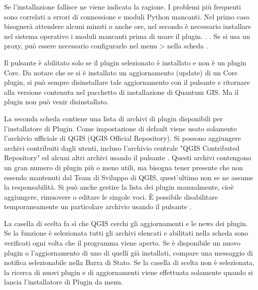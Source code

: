 Se l'installazione fallisce ne viene indicata la ragione. I problemi più frequenti sono correlati a errori di connessione e moduli Python mancanti. Nel primo caso bisognerà attendere alcuni minuti o anche ore, nel secondo è necessario installare nel sistema operativo i moduli mancanti  prima di usare il plugin. . . Se si usa un proxy, può essere necessario configurarlo nel menu  >  nella scheda .

Il pulsante  è abilitato solo se il plugin selezionato è installato e non è un plugin Core. Da notare che se si è installato un aggiornamento (update) di un Core plugin, si può sempre disinstallare tale aggiornamento con il pulsante  e ritornare alla versione contenuta nel pacchetto di installazione di Quantum GIS. Ma il plugin non può venir disinstallato.


La seconda scheda  contiene una lista di archivi di plugin disponibili per l'installatore di Plugin. Come impostazione di default viene usato solamente l'archivio ufficiale di QGIS (QGIS Official Repository). Si possono aggiungere archivi contribuiti dagli utenti, incluso l'archivio centrale "QGIS Contributed Repository" ed alcuni altri archivi usando il pulsante . Questi archivi contengono un gran numero di plugin più o meno utili, ma bisogna tener presente che non essendo mantenuti dal Team di Sviluppo di QGIS, quest'ultimo non se ne assume la responsabilità.
Si può anche gestire la lista dei plugin manualmente, cioè aggiungere, rimuovere o editare le singole voci. È possibile disabilitare temporaneamente un particolare archivio usando il pulsante .

La casella di scelta  fa sì che QGIS cerchi gli aggiornamenti e le news dei plugin. Se la funzione è selezionata tutti gli archivi elencati e abilitati nella scheda  sono verificati ogni volta che il programma viene aperto. Se è disponibile un nuovo plugin o l'aggiornamento di uno di quelli già installati, compare una messaggio di notifica selezionabile nella Barra di Stato. Se la casella di scelta non è selezionata, la ricerca di nuovi plugin e di aggiornamenti viene effettuata solamente quando si lancia l'installatore di Plugin da menu.

